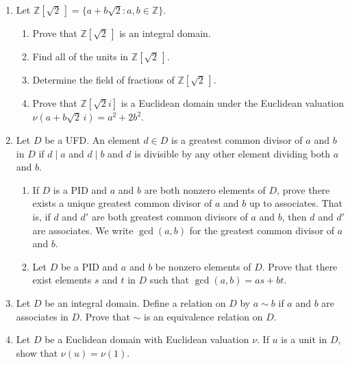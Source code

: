 {\begin{enumerate}
 
 
 
\item
Let ${\mathbb Z}[ \sqrt{2}\, ] = \{ a + b \sqrt{2} : a, b \in {\mathbb Z} \}$. 
\begin{enumerate}

 \item
Prove that ${\mathbb Z}[ \sqrt{2}\, ]$ is an integral domain. 

 \item
Find all of the units in ${\mathbb Z}[\sqrt{2}\, ]$. 

 \item
Determine the field of fractions of ${\mathbb Z}[ \sqrt{2}\, ]$. 
 
 \item
Prove that  ${\mathbb Z}[ \sqrt{2} i ]$ is a Euclidean domain under the
Euclidean valuation $\nu( a + b \sqrt{2}\, i) = a^2 + 2b^2$. 
 
\end{enumerate}


\item
Let $D$ be a UFD. An element $d \in D$ is a {\bfi greatest common
divisor of} $a$
{\bfi and} $b$ {\bfi in} $D$ if $d \mid a$ and $d \mid b$ and $d$ is
divisible by any other element dividing both $a$ and $b$.  
\begin{enumerate}

 \item
If $D$ is a PID and $a$ and $b$ are both nonzero elements of $D$,
prove there exists a unique greatest common divisor of $a$ and $b$ up to associates. That is, if $d$ and $d'$ are both greatest common divisors of $a$ and $b$, then $d$ and $d'$ are associates.  We write $\gcd( a, b)$ for the greatest common divisor of $a$ and $b$. 


 \item
Let $D$ be a PID and $a$ and $b$ be nonzero elements of $D$. Prove
that there exist elements $s$ and $t$ in $D$ such that $\gcd(a, b) =
as + bt$.

\end{enumerate}


\item
Let $D$ be an integral domain. Define a relation on $D$ by $a \sim b$
if $a$ and $b$ are associates in $D$.  Prove that $\sim$ is an
equivalence relation on $D$.  


\item
Let $D$ be a Euclidean domain with Euclidean valuation $\nu$.  If $u$
is a unit in $D$, show that $\nu(u) = \nu(1)$.



\end{enumerate}}
